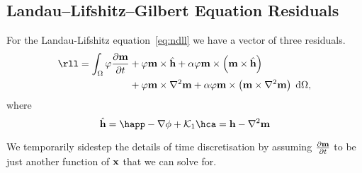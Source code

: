 

\subsection{Landau--Lifshitz--Gilbert Equation Residuals}


For the Landau-Lifshitz equation~\eqref{eq:ndll} we have a vector of three residuals.
\begin{equation}
  \begin{aligned}
    \rll = \int_\magd \tbf \dmdt &+ \tbf \mv \times \hat{\hv}
    + \dampc \tbf \mv \times \left( \mv \times \hat{\hv} \right) \\
    &+  \tbf \mv \times \lap \mv
    + \dampc \tbf \mv \times \left(\mv \times \lap \mv\right) \d\magd,
    \label{res:contllg}
  \end{aligned}
\end{equation}
where
\begin{equation}
  \hat{\hv} = \happ - \nabla \phi + \kone \hca = \hv - \lap \mv
\end{equation}

We temporarily sidestep the details of time discretisation by assuming $\frac{\partial \mathbf{m}}{\partial t}$ to be just another function of $\mathbf{x}$ that we can solve for.


